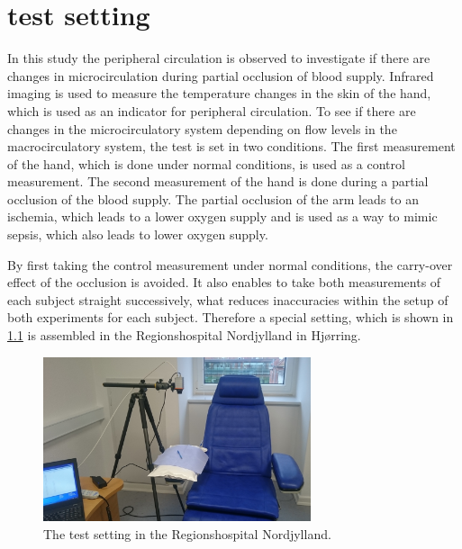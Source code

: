 \chapter{test setting}
In this study the peripheral circulation is observed to investigate if there are changes in microcirculation during partial occlusion of blood supply. Infrared imaging is used to measure the temperature changes in the skin of the hand, which is used as an indicator for peripheral circulation. 
To see if there are changes in the microcirculatory system depending on flow levels in the macrocirculatory system, the test is set in two conditions. The first measurement of the hand, which is done under normal conditions, is used as a control measurement. The second measurement of the hand is done during a partial occlusion of the blood supply. The partial occlusion of the arm leads to an ischemia, which leads to a lower oxygen supply and is used as a way to mimic sepsis, which also leads to lower oxygen supply. 

By first taking the control measurement under normal conditions, the carry-over effect of the occlusion is avoided. It also enables to take both measurements of each subject straight successively, what reduces inaccuracies within the setup of both experiments for each subject. Therefore a special setting, which is shown in \cref{fig:setting} is assembled in the Regionshospital Nordjylland in Hj\o{}rring.

\begin{figure}[H]
	\includegraphics[width=0.7\textwidth]{figures/setting}
	\caption{The test setting in the Regionshospital Nordjylland.}
	\label{fig:setting}
\end{figure}


